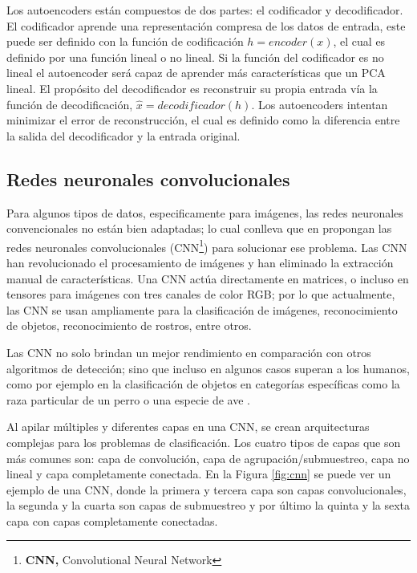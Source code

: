Los autoencoders est\'{a}n compuestos de dos partes: el codificador y decodificador. El codificador aprende una representaci\'{o}n compresa de los datos de entrada, este puede ser definido con la funci\'{o}n de codificaci\'{o}n $h=encoder(x)$, el cual es definido por una funci\'{o}n lineal o no lineal. Si la funci\'{o}n del codificador es no lineal el autoencoder ser\'{a} capaz de aprender m\'{a}s caracter\'{i}sticas que un PCA lineal. El prop\'{o}sito del decodificador es reconstruir su propia entrada v\'{i}a la funci\'{o}n de decodificaci\'{o}n, $\hat{x} = decodificador(h)$. Los autoencoders intentan minimizar el error de reconstrucci\'{o}n, el cual es definido como la diferencia entre la salida del decodificador y la entrada original.

\subsection{Redes neuronales convolucionales}

Para algunos tipos de datos, especificamente para im\'{a}genes, las redes neuronales convencionales no est\'{a}n bien adaptadas; lo cual conlleva que en \cite{48} propongan las redes neuronales convolucionales (CNN\footnote{\textbf{CNN,} Convolutional Neural Network}) para solucionar ese problema. Las CNN han revolucionado el procesamiento de im\'{a}genes y han eliminado la extracci\'{o}n manual de caracter\'{i}sticas. Una CNN act\'{u}a directamente en matrices, o incluso en tensores para im\'{a}genes con tres canales de color RGB; por lo que actualmente, las CNN se usan ampliamente para la clasificaci\'{o}n de im\'{a}genes, reconocimiento de objetos, reconocimiento de rostros, entre otros.

\vspace{5mm} %

Las CNN no solo brindan un mejor rendimiento en comparaci\'{o}n con otros algoritmos de detecci\'{o}n; sino que incluso en algunos casos superan a los humanos, como por ejemplo en la clasificaci\'{o}n de objetos en categor\'{i}as espec\'{i}ficas como la raza particular de un perro o una especie de ave \cite{49}.

\vspace{5mm} %

Al apilar múltiples y diferentes capas en una CNN, se crean arquitecturas complejas para los problemas de clasificación. Los cuatro tipos de capas que son más comunes son: capa de convolución, capa de agrupación/submuestreo, capa no lineal y capa completamente conectada. En la Figura \ref{fig:cnn} se puede ver un ejemplo de una CNN, donde la primera y tercera capa son capas convolucionales, la segunda y la cuarta son capas de submuestreo y por \'{u}ltimo la quinta y la sexta capa con capas completamente conectadas. 

